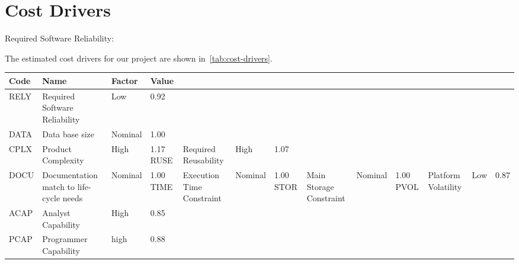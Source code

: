 \section{Cost Drivers}

\begin{description}

    \item[Required Software Reliability:]
\end{description}

The estimated cost drivers for our project are shown in~\autoref{tab:cost-drivers}.

\begin{table}[h]
    \centering
    \begin{tabular}{| l | l | l | l | l |}
        \hline
        \textbf{Code}   & \textbf{Name}                             & \textbf{Factor}   & \textbf{Value}    \\
        \hline
        RELY            & Required Software Reliability             & Low               & 0.92                 \\
        \hline
        DATA            & Data base size                            & Nominal           & 1.00                 \\
        \hline
        CPLX            & Product Complexity                        & High              & 1.17%
        \hline
        RUSE            & Required Reusability                      & High              & 1.07                 \\
        \hline
        DOCU            & Documentation match to life-cycle needs    & Nominal          & 1.00%
        \hline
        TIME            & Execution Time Constraint                 & Nominal           & 1.00%
        \hline
        STOR            & Main Storage Constraint                   & Nominal           & 1.00%
        \hline
        PVOL            & Platform Volatility                       & Low               & 0.87                 \\
        \hline
        ACAP            & Analyst Capability                        & High               & 0.85                 \\
        \hline
        PCAP            & Programmer Capability                     & high               & 0.88                 \\

\end{tabular}
\end{table}
